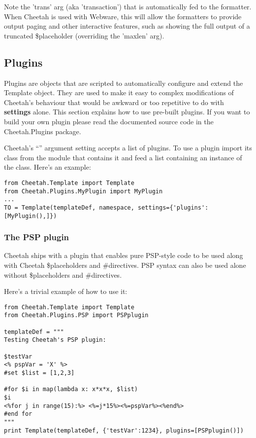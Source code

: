 Note the 'trans' arg (aka 'transaction') that is automatically fed to the
formatter.  When Cheetah is used with Webware, this will allow the formatters to
provide output paging and other interactive features, such as showing the full
output of a truncated \$placeholder (overriding the 'maxlen' arg).



\subsection{Plugins}

Plugins are objects that are scripted to automatically configure and extend the
Template object.  They are used to make it easy to complex modifications of
Cheetah's behaviour that would be awkward or too repetitive to do with {\bf
  settings} alone. This section explains how to use pre-built plugins. If you
want to build your own plugin please read the documented source code in the
Cheetah.Plugins package.

Cheetah's ``'' argument setting accepts a list of plugins. To use
a plugin import its class from the module that contains it and feed
 a list containing an instance of the class. Here's an example:

\begin{verbatim}
from Cheetah.Template import Template
from Cheetah.Plugins.MyPlugin import MyPlugin
...
TO = Template(templateDef, namespace, settings={'plugins':[MyPlugin(),]})
\end{verbatim}


\subsubsection{The PSP plugin}
Cheetah ships with a plugin that enables pure PSP-style code to be used along
with Cheetah \$placeholders and \#directives.  PSP syntax can also be used
alone without \$placeholders and \#directives.

Here's a trivial example of how to use it:
\begin{verbatim}
from Cheetah.Template import Template
from Cheetah.Plugins.PSP import PSPplugin

templateDef = """
Testing Cheetah's PSP plugin:
 
$testVar
<% pspVar = 'X' %>
#set $list = [1,2,3]
 
#for $i in map(lambda x: x*x*x, $list)
$i
<%for j in range(15):%> <%=j*15%><%=pspVar%><%end%>
#end for
"""
print Template(templateDef, {'testVar':1234}, plugins=[PSPplugin()])

\end{verbatim}

